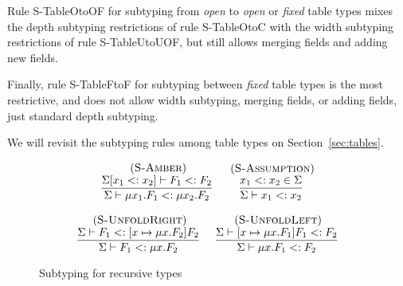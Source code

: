 \documentclass[10pt]{sigplanconf}
\newcommand{\mylabel}[1]{\; (\textsc{#1})}
\newcommand{\senv}{\Sigma}
\newcommand{\subtype}{<:}
\begin{document}
Rule {\sc S-TableOtoOF} for subtyping from {\em open} to {\em open} or {\em fixed} table types mixes the depth subtyping restrictions of rule {\sc S-TableOtoC} with the width subtyping restrictions of rule {\sc S-TableUtoUOF}, but still allows merging fields and adding new fields.

Finally, rule {\sc S-TableFtoF} for subtyping between {\em fixed} table types is the most restrictive, and does not allow width
subtyping, merging fields, or adding fields, just standard
depth subtyping.

We will revisit the subtyping rules among table types on
Section~\ref{sec:tables}.

\begin{figure}[t]
{\footnotesize
\[
\begin{array}{c}
\begin{array}{c}
\mylabel{S-Amber}\\
\dfrac{\senv[x_{1} \subtype x_{2}] \vdash F_{1} \subtype F_{2}}
{\senv \vdash \mu x_{1}.F_{1} \subtype \mu x_{2}.F_{2}}
\end{array}
\;
\begin{array}{c}
\mylabel{S-Assumption}\\
\dfrac{x_{1} \subtype x_{2} \in \senv}
{\senv \vdash x_{1} \subtype x_{2}}
\end{array}\\\\
\begin{array}{c}
\mylabel{S-UnfoldRight}\\
\dfrac{\senv \vdash F_{1} \subtype [x \mapsto \mu x.F_{2}]F_{2}}
{\senv \vdash F_{1} \subtype \mu x.F_{2}}
\end{array}
\;
\begin{array}{c}
\mylabel{S-UnfoldLeft}\\
\dfrac{\senv \vdash [x \mapsto \mu x.F_{1}]F_{1} \subtype F_{2}}
{\senv \vdash \mu x.F_{1} \subtype F_{2}}
\end{array}
\end{array}
\]
}
\caption{Subtyping for recursive types}
\label{fig:subrec}
\end{figure}
\end{document}
